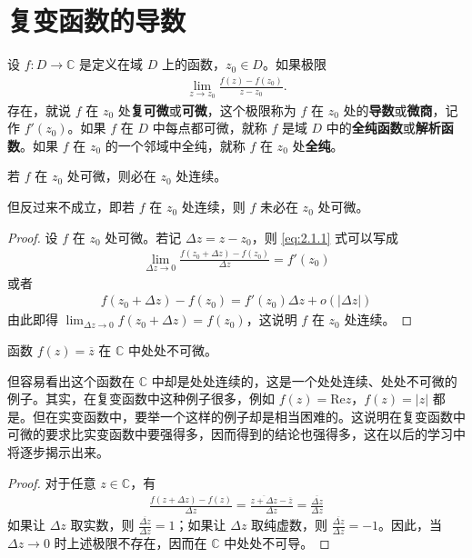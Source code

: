 \documentclass[../../main.tex]{subfiles}
\begin{document}
\section{复变函数的导数}

\begin{definition}
设 \( f:D \to \mathbb{C} \) 是定义在域 \( D \) 上的函数，\( z_0 \in D \)。如果极限
\begin{align}
\lim_{z \to z_0} \frac{f(z) - f(z_0)}{z - z_0}. \label{eq:2.1.1}
\end{align}
存在，就说 \( f \) 在 \( z_0 \) 处\textbf{复可微}或\textbf{可微}，这个极限称为 \( f \) 在 \( z_0 \) 处的\textbf{导数}或\textbf{微商}，记作 \( f'(z_0) \)。如果 \( f \) 在 \( D \) 中每点都可微，就称 \( f \) 是域 \( D \) 中的\textbf{全纯函数}或\textbf{解析函数}。如果 \( f \) 在 \( z_0 \) 的一个邻域中全纯，就称 \( f \) 在 \( z_0 \) 处\textbf{全纯}。
\end{definition}

\begin{proposition}\label{proposition:全纯函数必连续}
若 \( f \) 在 \( z_0 \) 处可微，则必在 \( z_0 \) 处连续。
\end{proposition}
\begin{remark}
但反过来不成立，即若 \( f \) 在 \( z_0 \) 处连续，则 \( f \) 未必在 \( z_0 \) 处可微。
\end{remark}
\begin{proof}
设 \( f \) 在 \( z_0 \) 处可微。若记 \( \Delta z = z - z_0 \)，则 \eqref{eq:2.1.1} 式可以写成
\begin{align*}
\lim_{\Delta z \to 0} \frac{f(z_0 + \Delta z) - f(z_0)}{\Delta z} = f'(z_0)
\end{align*}
或者
\begin{align}
f(z_0 + \Delta z) - f(z_0) = f'(z_0)\Delta z + o(|\Delta z|) \label{eq:2.1.2}
\end{align}
由此即得 \( \lim_{\Delta z \to 0} f(z_0 + \Delta z) = f(z_0) \)，这说明 \( f \) 在 \( z_0 \) 处连续。
\end{proof}

\begin{example}
函数 \( f(z) = \overline{z} \) 在 \( \mathbb{C} \) 中处处不可微。
\end{example}
\begin{note}
但容易看出这个函数在 \( \mathbb{C} \) 中却是处处连续的，这是一个处处连续、处处不可微的例子。其实，在复变函数中这种例子很多，例如 \( f(z) = \text{Re}z \)，\( f(z) = |z| \) 都是。但在实变函数中，要举一个这样的例子却是相当困难的。这说明在复变函数中可微的要求比实变函数中要强得多，因而得到的结论也强得多，这在以后的学习中将逐步揭示出来。
\end{note}
\begin{proof}
对于任意 \( z \in \mathbb{C} \)，有
\begin{align*}
\frac{f(z + \Delta z) - f(z)}{\Delta z} = \frac{\overline{z + \Delta z} - \overline{z}}{\Delta z} = \frac{\overline{\Delta z}}{\Delta z}
\end{align*}
如果让 \( \Delta z \) 取实数，则 \( \frac{\overline{\Delta z}}{\Delta z} = 1 \)；如果让 \( \Delta z \) 取纯虚数，则 \( \frac{\overline{\Delta z}}{\Delta z} = -1 \)。因此，当 \( \Delta z \to 0 \) 时上述极限不存在，因而在 \( \mathbb{C} \) 中处处不可导。
\end{proof}
\end{document}
